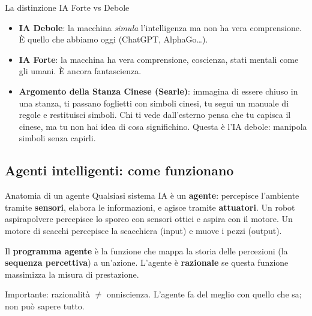 \documentclass[12pt,a4paper]{article}
\begin{document}
\begin{ricorda}{La distinzione IA Forte vs Debole}
\begin{itemize}[noitemsep]
  \item \textbf{IA Debole}: la macchina \emph{simula} l'intelligenza ma non ha vera comprensione. È quello che abbiamo oggi (ChatGPT, AlphaGo\ldots).
  \item \textbf{IA Forte}: la macchina ha vera comprensione, coscienza, stati mentali come gli umani. È ancora fantascienza.
  \item \textbf{Argomento della Stanza Cinese (Searle)}: immagina di essere chiuso in una stanza, ti passano foglietti con simboli cinesi, tu segui un manuale di regole e restituisci simboli. Chi ti vede dall'esterno pensa che tu capisca il cinese, ma tu non hai idea di cosa significhino. Questa è l'IA debole: manipola simboli senza capirli.
\end{itemize}
\end{ricorda}

\subsection{Agenti intelligenti: come funzionano}

\begin{narrativo}{Anatomia di un agente}
Qualsiasi sistema IA è un \textbf{agente}: percepisce l'ambiente tramite \textbf{sensori}, elabora le informazioni, e agisce tramite \textbf{attuatori}. Un robot aspirapolvere percepisce lo sporco con sensori ottici e aspira con il motore. Un motore di scacchi percepisce la scacchiera (input) e muove i pezzi (output).

Il \textbf{programma agente} è la funzione che mappa la storia delle percezioni (la \textbf{sequenza percettiva}) a un'azione. L'agente è \textbf{razionale} se questa funzione massimizza la misura di prestazione.

Importante: razionalità $\neq$ onniscienza. L'agente fa del meglio con quello che sa; non può sapere tutto.
\end{narrativo}
\end{document}
